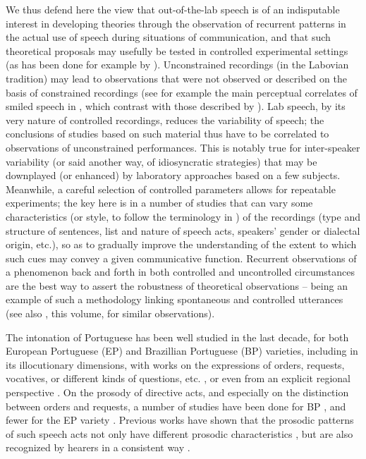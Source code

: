 \documentclass[output=paper]{LSP/langsci}
\begin{document}
We thus defend here the view that out-of-the-lab speech is of an indisputable interest in developing theories through the observation of recurrent patterns in the actual use of speech during situations of communication, and that such theoretical proposals may usefully be tested in controlled experimental settings (as has been done for example by \citealt{GussenhovenChen2000,Boula2002,house2005phrase,dimperio2010alignment,Vanrell2013certainty,Borras-Comes2015}). 
Unconstrained recordings (in the Labovian tradition) may lead to observations that were not observed or described on the basis of constrained recordings (see for example the main perceptual correlates of smiled speech in \citealt{Emond2013}, which contrast with those described by \citealt{Tartter1980}). 
Lab speech, by its very nature of controlled recordings, reduces the variability of speech; the conclusions of studies based on such material thus have to be correlated to observations of unconstrained performances. 
This is notably true for inter-speaker variability (or said another way, of idiosyncratic strategies) that may be downplayed (or enhanced) by laboratory approaches based on a few subjects. 
Meanwhile, a careful selection of controlled parameters allows for repeatable experiments; the key here is in a number of studies that can vary some characteristics (or style, to follow the terminology in \citealt{Wagner.2015}) of the recordings (type and structure of sentences, list and nature of speech acts, speakers' gender or dialectal origin, etc.), so as to gradually improve the understanding of the extent to which such cues may convey a given communicative function. 
Recurrent observations of a phenomenon back and forth in both controlled and uncontrolled circumstances are the best way to assert the robustness of theoretical observations -- \citet{house2005phrase} being an example of such a methodology linking spontaneous and controlled utterances (see also \citeauthor{Peskova.2018}, this volume, for similar observations).

The intonation of Portuguese has been well studied in the last decade, for both European Portuguese (EP) and Brazillian Portuguese (BP) varieties, including in its illocutionary dimensions, with works on the expressions of orders, requests, vocatives, or different kinds of questions, etc. \citep{moraes2008pitch,Frota2014,frotaPrieto2015,FrotaAndMoraes2016}, or even from an explicit regional perspective \citep{frota2015portuguese}. 
On the prosody of directive acts, and especially on the distinction between orders and requests, a number of studies have been done for BP \citep{Bodolay2009,Queiroz2011,Rocha2013,Rocha2016}, and fewer for the EP variety \citep{fale2007imperatives}.
Previous works have shown that the prosodic patterns of such speech acts not only have different prosodic characteristics \citep{fale2007imperatives}, but are also recognized by hearers in a consistent way \citep{veliz2004intonational,moraes2008pitch,moraes2014}.\largerpage[-1]
\end{document}
